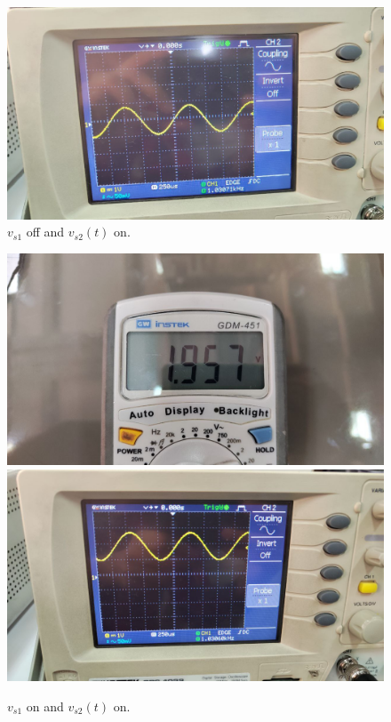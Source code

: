 \documentclass[11pt]{article}
\begin{document}
\begin{question}
\begin{subquestion}
{\begin{figure}[H]
                \includegraphics[scale=0.1,angle=0]{Fig/10.jpeg}
                \caption{$v_{s1}$ off and $v_{s2}(t)$ on.}
            \end{figure}
            \begin{figure}[H]
                \centering
                \includegraphics[scale=0.1,angle=0]{Fig/8.jpeg}
                \includegraphics[scale=0.1,angle=0]{Fig/11.jpeg}
                \caption{$v_{s1}$ on and $v_{s2}(t)$ on.}
            \end{figure}
        }
    \end{subquestion}


\end{question}
\end{document}
